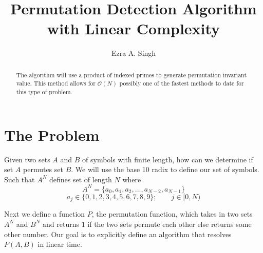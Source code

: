 \documentclass[]{article}
\title{Permutation Detection Algorithm with Linear Complexity}
\author{Ezra A. Singh}
\begin{document}
\maketitle

\begin{abstract}
The algorithm will use a product of indexed primes to generate permutation invariant value. This method allows for $\mathcal{O}(N)$ possibly one of the fastest methods to date for this type of problem.
\end{abstract}

\section*{The Problem}
Given two sets $A$ and $B$ of symbols with finite length, how can we determine if set $A$ permutes set $B$. We will use the base 10 radix to define our set of symbols. Such that $A^{N}$ defines set of length $N$ where
\begin{equation}
A^{N}=\{a_{0}, a_{1}, a_{2}, ..., a_{N-2}, a_{N-1}\}
\end{equation}
\begin{equation}
a_{j} \in \{0,1, 2, 3, 4, 5, 6, 7, 8, 9\};\qquad j \in [0, N)
\end{equation}

Next we define a function $P$, the permutation function, which takes in two sets $A^{N}$ and $B^{N}$ and returns $1$ if the two sets permute each other else returns some other number. Our goal is to explicitly define an algorithm that resolves $P(A, B)$ in linear time.
\end{document}
